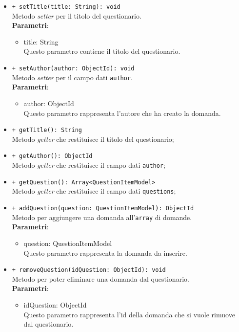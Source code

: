\begin{itemize}
\begin{itemize}
				\item \texttt{+ setTitle(title: String): void} \\
				Metodo \textit{setter} per il titolo del questionario.\\
				\textbf{Parametri}:
				\begin{itemize}
					\item {title: String}\\
					Questo parametro contiene il titolo del questionario. 
				\end{itemize}
				\item \texttt{+ setAuthor(author: ObjectId): void} \\
				Metodo \textit{setter} per il campo dati \texttt{author}.\\
				\textbf{Parametri}:
				\begin{itemize}
					\item {author: ObjectId}\\
					Questo parametro rappresenta l'autore che ha creato la domanda.
				\end{itemize}
				
				\item \texttt{+ getTitle(): String} \\
				Metodo \textit{getter} che restituisce il titolo del questionario;
				
				\item \texttt{+ getAuthor(): ObjectId} \\
				Metodo \textit{getter} che restituisce il campo dati \texttt{author};
				
				\item \texttt{+ getQuestion(): Array<QuestionItemModel>} \\
				Metodo \textit{getter} che restituisce il campo dati \texttt{questions};
				
				\item \texttt{+ addQuestion(question: QuestionItemModel): ObjectId} \\
				Metodo per aggiungere una domanda all'\texttt{array} di domande.\\
				\textbf{Parametri}:
				\begin{itemize}
					\item {question: QuestionItemModel}\\
					Questo parametro rappresenta la domanda da inserire.
				\end{itemize}
				
				\item \texttt{+ removeQuestion(idQuestion: ObjectId): void} \\
				Metodo per poter eliminare una domanda dal questionario.\\
				\textbf{Parametri}:
				\begin{itemize}
					\item {idQuestion: ObjectId}\\
					Questo parametro rappresenta l'id della domanda che si vuole rimuove dal questionario.
				\end{itemize}
				

\end{itemize}
\end{itemize}
